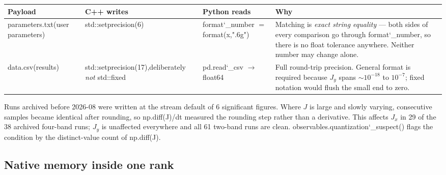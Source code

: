 \documentclass[11pt,a4paper]{article}
\newcommand{\code}[1]{{\ttfamily #1}}
\newcommand{\brk}{\discretionary{}{}{}}
\newcommand{\uu}{\char`_\brk}
\newcommand{\fn}[1]{{\ttfamily #1}}
\begin{document}
\begin{center}
\scriptsize
\begin{tabular}{@{}L{0.15\textwidth} L{0.22\textwidth} L{0.21\textwidth} L{0.34\textwidth}@{}}
\toprule
\textbf{Payload} & \textbf{C++ writes} & \textbf{Python reads} & \textbf{Why} \\
\midrule
\code{parameters.txt}\newline (user parameters)
 & \fn{std::\brk setprecision(6)}
 & \fn{format\uu number} $=$ \fn{format(x,\brk ".6g")}
 & Matching is \emph{exact string equality} --- both sides of every comparison go
   through \fn{format\uu number}, so there is no float tolerance anywhere.
   Neither number may change alone. \\
\addlinespace
\code{data.csv}\newline (results)
 & \fn{std::\brk setprecision(17)},\newline deliberately \emph{not} \fn{std::\brk fixed}
 & \fn{pd.read\uu csv} $\rightarrow$ \fn{float64}
 & Full round-trip precision. General format is required because $J_y$ spans
   $\sim10^{-18}$ to $10^{-7}$; fixed notation would flush the small end to
   zero. \\
\bottomrule
\end{tabular}
\end{center}

\begin{keybox}[title={Historical consequence, recorded here because it is invisible in the code}]
Runs archived before 2026-08 were written at the stream default of 6
significant figures. Where $J$ is large and slowly varying, consecutive samples
became identical after rounding, so \fn{np.diff(J)/dt} measured the rounding
step rather than a derivative. This affects $J_x$ in 29 of the 38 archived
four-band runs; $J_y$ is unaffected everywhere and all 61 two-band runs are
clean. \fn{observables.quantization\uu suspect()} flags the condition by the
distinct-value count of \fn{np.diff(J)}.
\end{keybox}

\subsection{Native memory inside one rank}
\end{document}
